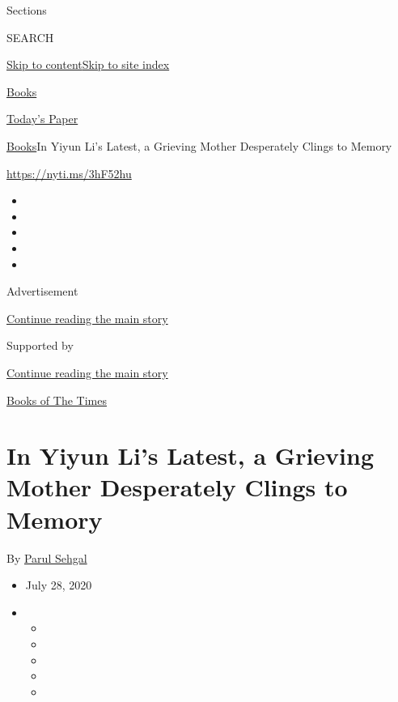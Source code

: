 Sections

SEARCH

\protect\hyperlink{site-content}{Skip to
content}\protect\hyperlink{site-index}{Skip to site index}

\href{https://www.nytimes3xbfgragh.onion/section/books}{Books}

\href{https://myaccount.nytimes3xbfgragh.onion/auth/login?response_type=cookie\&client_id=vi}{}

\href{https://www.nytimes3xbfgragh.onion/section/todayspaper}{Today's
Paper}

\href{/section/books}{Books}\textbar{}In Yiyun Li's Latest, a Grieving
Mother Desperately Clings to Memory

\url{https://nyti.ms/3hF52hu}

\begin{itemize}
\item
\item
\item
\item
\item
\end{itemize}

Advertisement

\protect\hyperlink{after-top}{Continue reading the main story}

Supported by

\protect\hyperlink{after-sponsor}{Continue reading the main story}

\href{/column/books-of-the-times}{Books of The Times}

\hypertarget{in-yiyun-lis-latest-a-grieving-mother-desperately-clings-to-memory}{%
\section{In Yiyun Li's Latest, a Grieving Mother Desperately Clings to
Memory}\label{in-yiyun-lis-latest-a-grieving-mother-desperately-clings-to-memory}}

By \href{https://www.nytimes3xbfgragh.onion/by/parul-sehgal}{Parul
Sehgal}

\begin{itemize}
\item
  July 28, 2020
\item
  \begin{itemize}
  \item
  \item
  \item
  \item
  \item
  \end{itemize}
\end{itemize}

